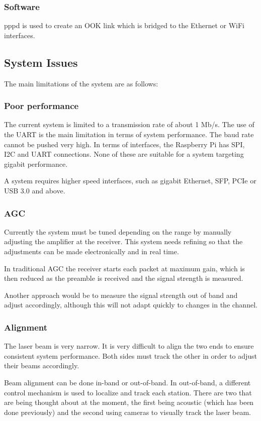 \documentclass{article}
\begin{document}
\subsubsection{Software}
pppd is used to create an OOK link which is bridged to the Ethernet or
WiFi interfaces.

\subsection{System Issues}
The main limitations of the system are as follows:

\subsubsection{Poor performance}
The current system is limited to a transmission rate of about 1 Mb/s. The use
of the UART is the main limitation in terms of system performance. The baud
rate cannot be pushed very high. In terms of interfaces, the Raspberry Pi has
SPI, I2C and UART connections. None of these are suitable for a system
targeting gigabit performance.

A system requires higher speed interfaces, such as gigabit Ethernet,
\ac{SFP}, \ac{PCIe} or \ac{USB} 3.0 and above.

\subsubsection{\ac{AGC}}
Currently the system must be tuned depending on the range by manually
adjusting the amplifier at the receiver. This system needs refining so that
the adjustments can be made electronically and in real time.

In traditional \ac{AGC} the receiver starts each packet at maximum gain,
which is then reduced as the preamble is received and the signal strength
is measured.

Another approach would be to measure the signal strength out of band and
adjust accordingly, although this will not adapt quickly to changes in the
channel.

\subsubsection{Alignment}
The laser beam is very narrow. It is very difficult to align the two ends
to ensure consistent system performance. Both sides must track the other in
order to adjust their beams accordingly.

Beam alignment can be done in-band or out-of-band. In out-of-band, a different
control mechanism is used to localize and track each station. There are two
that are being thought about at the moment, the first being acoustic (which
has been done previously) and the second using cameras to visually track the
laser beam.
\end{document}
